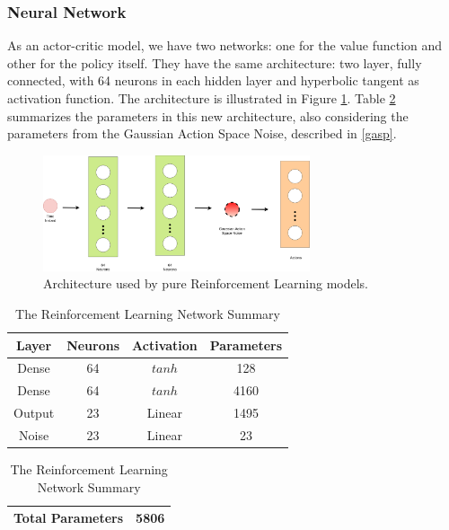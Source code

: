 \subsubsection{Neural Network}
As an actor-critic model, we have two networks: one for the value function and other for the policy itself. They have the same architecture: two layer, fully connected, with 64 neurons in each hidden layer and hyperbolic tangent as activation function. The architecture is illustrated in Figure \ref{rlnetwork}. Table \ref{tab:rl_network_summary} summarizes the parameters in this new architecture, also considering the parameters from the Gaussian Action Space Noise, described in \ref{gasp}.

\begin{figure}[!htbp]
	\centering
	\includegraphics[width=0.7\textwidth]{Cap5/rlnetwork.eps}
	\caption{Architecture used by pure Reinforcement Learning models.}
	\label{rlnetwork}
\end{figure}

\begin{table}[htbp]
	\caption{The Reinforcement Learning Network Summary}
	\begin{center}
		\begin{tabular}{|c|c|c|c|}
			\hline
			\textbf{Layer}&{\textbf{Neurons}}& \textbf{Activation}& \textbf{Parameters} \\
			\hline
			Dense & 64 & $tanh$ & 128  \\
			\hline
			Dense & 64 & $tanh$ & 4160 \\
			\hline
			Output & 23 & Linear & 1495 \\
			\hline
			Noise & 23 & Linear & 23 \\
			\hline
		\end{tabular}
		\begin{tabular}{|c|c|}
			\hline
			\textbf{Total Parameters} & 5806 \\
			\hline
		\end{tabular}
		\label{tab:rl_network_summary}
	\end{center}
\end{table}


